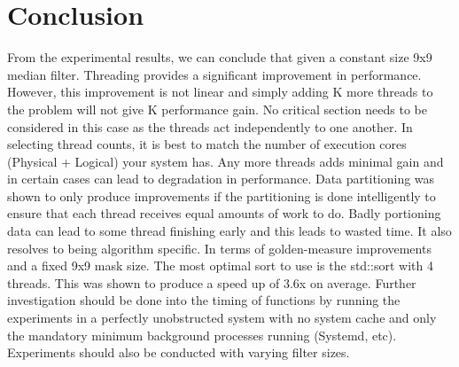 \section{Conclusion}
From the experimental results, we can conclude that given a constant size 9x9 median filter. Threading provides a significant improvement in performance. However, this improvement is not linear and simply adding K more threads to the problem will not give K performance gain.
\newline
No critical section needs to be considered in this case as the threads act independently to one another.
\newline
In selecting thread counts, it is best to match the number of execution cores (Physical + Logical) your system has. Any more threads adds minimal gain and in certain cases can lead to degradation in performance.
\newline
Data partitioning was shown to only produce improvements if the partitioning is done intelligently to ensure that each thread receives equal amounts of work to do. Badly portioning data can lead to some thread finishing early and this leads to wasted time. It also resolves to being algorithm specific.
\newline
In terms of golden-measure improvements and a fixed 9x9 mask size. The most optimal sort to use is the std::sort with 4 threads. This was shown to produce a speed up of 3.6x on average.
\newline
Further investigation should be done into the timing of functions by running the experiments in a perfectly unobstructed system with no system cache and only the mandatory minimum background processes running (Systemd, etc). Experiments should also be conducted with varying filter
 sizes.\\

